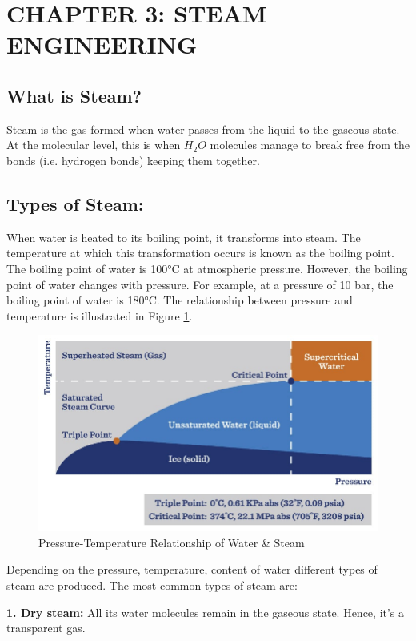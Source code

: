
\section{CHAPTER 3: STEAM ENGINEERING}
\subsection{What is Steam?}
Steam is the gas formed when water passes from the liquid to the gaseous state.
At the molecular level, this is when $H_2O$ molecules manage to break free from the bonds 
(i.e. hydrogen bonds) keeping them together\cite{what_is_steam}\relax.


\subsection{Types of Steam:}
When water is heated to its boiling point, it transforms into steam. The temperature at which this transformation occurs is known as the boiling point. The boiling point of water is 100°C at atmospheric pressure. However, the boiling point of water changes with pressure. For example, at a pressure of 10 bar, the boiling point of water is 180°C. The relationship between pressure and temperature is illustrated in Figure \ref{fig:ptrws}.

\begin{figure}[h!]
    \centering
    \includegraphics[width=\linewidth]{figs/steam.jpg}
    \caption{Pressure-Temperature Relationship of Water \& Steam}
    \label{fig:ptrws}
\end{figure}
Depending on the pressure, temperature, content of water different types of steam are produced. The most common types of steam are:

\textbf{1. Dry steam:} All its water molecules remain in the gaseous state. Hence, it's a transparent gas\cite{steam_types_tlv}.

